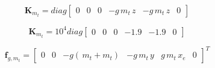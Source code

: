 \documentclass{article}
\begin{document}

\begin{small}
    \begin{equation}
        \mathbf{K}_{m_t} = diag
        \begin{bmatrix}
			0 & 0 & 0 & -g\,m_{t}\,z  & -g\,m_{t}\,z   & 0
        \end{bmatrix}
        \label{eq:fea:K_m_ecc}
    \end{equation}
\end{small}

\begin{small}
    \begin{equation}
        \mathbf{K}_{m_t} = 10^{4} diag
        \begin{bmatrix}
			0 & 0 & 0 & -1.9  & -1.9   & 0
        \end{bmatrix}
        \label{eq:fea:K_m_ecc_num}
    \end{equation}
\end{small}

\begin{small}
    \begin{equation}
        \mathbf{f}_{g,m_t} = 
        \begin{bmatrix}
         0 &  0 &  -g(\,m_{t}+m_{t}) &  -g\,m_{t}\,y    &  g\,m_{t}\,x_{e}  &  0
        \end{bmatrix} ^{T}
        \label{eq:fea:Fstat}
    \end{equation}
\end{small}
\end{document}

